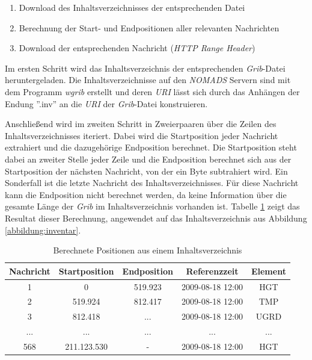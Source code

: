\begin{enumerate}
\item Download des Inhaltsverzeichnisses der entsprechenden Datei
\item Berechnung der Start- und Endpositionen aller relevanten Nachrichten
\item Download der entsprechenden Nachricht (\textit{HTTP Range Header})
\end{enumerate}

Im ersten Schritt wird das Inhaltsverzeichnis der entsprechenden
\textit{Grib}-Datei heruntergeladen. Die Inhaltsverzeichnisse auf den
\textit{NOMADS} Servern sind mit dem Programm \textit{wgrib} erstellt
und deren \textit{URI} lässt sich durch das Anhängen der Endung
''.inv'' an die \textit{URI} der \textit{Grib}-Datei konstruieren.

Anschließend wird im zweiten Schritt in Zweierpaaren über die Zeilen
des Inhaltsverzeichnisses iteriert. Dabei wird die Startposition jeder
Nachricht extrahiert und die dazugehörige Endposition berechnet. Die
Startposition steht dabei an zweiter Stelle jeder Zeile und die
Endposition berechnet sich aus der Startposition der nächsten
Nachricht, von der ein Byte subtrahiert wird. Ein Sonderfall ist die
letzte Nachricht des Inhaltsverzeichnisses. Für diese Nachricht kann
die Endposition nicht berechnet werden, da keine Information über die
gesamte Länge der \textit{Grib} im Inhaltsverzeichnis vorhanden
ist. Tabelle \ref{tab:inhaltsverzeichnis_mit_positionen} zeigt das
Resultat dieser Berechnung, angewendet auf das Inhaltsverzeichnis aus
Abbildung \ref{abbildung:inventar}.

\begin{table}[h]
  \centering
  {\sf
    \footnotesize
    \begin{longtable}{@{}ccccc}
      \toprule
      \textbf{Nachricht} & \textbf{Startposition} & \textbf{Endposition} & \textbf{Referenzzeit} & \textbf{Element} \\
      \midrule
      1 & 0 & 519.923 & 2009-08-18 12:00 & HGT \\
      2 & 519.924 & 812.417 & 2009-08-18 12:00 & TMP \\
      3 & 812.418 & ... & 2009-08-18 12:00 & UGRD \\
      ... & ... & ... & ... & ... \\
      568 & 211.123.530 & - & 2009-08-18 12:00 & HGT \\
      \bottomrule
    \end{longtable}
  }

  \caption{Berechnete Positionen aus einem Inhaltsverzeichnis}
  \label{tab:inhaltsverzeichnis_mit_positionen}

\end{table}

